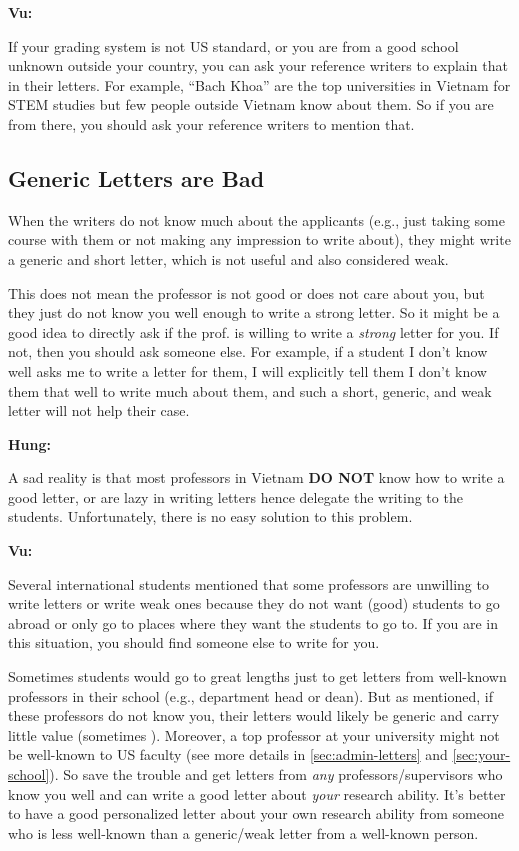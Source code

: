 \documentclass[oneside,11pt,dvipsnames]{book}
\newenvironment{commentbox}[1][]{
  \small
  \begin{mybox}
    {\small \textbf{#1}}
  }{
  \end{mybox}
}
\newcommand{\red}[1]{{\color{red}{#1}}}
\begin{document}
\begin{commentbox}[Vu:]
  If your grading system is not US standard, or you are from a good school unknown outside your country, you can ask your reference writers to explain that in their letters.  For example, ``Bach Khoa'' are the top universities in Vietnam for STEM studies but few people outside Vietnam know about them.  So if you are from there, you should ask your reference writers to mention that.
\end{commentbox}


\subsection{Generic Letters are Bad} When the writers do not know much about the applicants (e.g., just taking some course with them or not making any impression to write about), they might write a generic and short letter, which is not useful and also considered weak. 

This does not mean the professor is not good or does not care about you, but they just do not know you well enough to write a strong letter.
So it might be a good idea to directly ask if the prof. is willing to write a \emph{strong} letter for you. If not, then you should ask someone else.  For example, if a student I don't know well asks me to write a letter for them, I will explicitly tell them I don't know them that well to write much about them, and such a short, generic, and weak letter will not help their case.


\begin{commentbox}[Hung:]
  A sad reality is that most professors in Vietnam \textbf{DO NOT} know how to write a good letter, or are lazy in writing letters hence delegate the writing to the students. Unfortunately, there is no easy solution to this problem.
\end{commentbox}

\begin{commentbox}[Vu:]

  Several international students mentioned that some professors are unwilling to write letters or write weak ones because they do not want (good) students to go abroad or only go to places where they want the students to go to. If you are in this situation, you should find someone else to write for you.
  \tcblower

Sometimes students would go to great lengths just to get letters from well-known professors in their school (e.g., department head or dean). But as mentioned, if these professors do not know you, their letters would likely be generic and carry little value (sometimes \red{red flags}). Moreover, a top professor at your university might not be well-known to US faculty (see more details in \autoref{sec:admin-letters} and \autoref{sec:your-school}). So save the trouble and get letters from \emph{any} professors/supervisors who know you well and can write a good letter about \emph{your} research ability. It's better to have a good personalized letter about your own research ability from someone who is less well-known than a generic/weak letter from a well-known person.

\end{commentbox}
\end{document}

